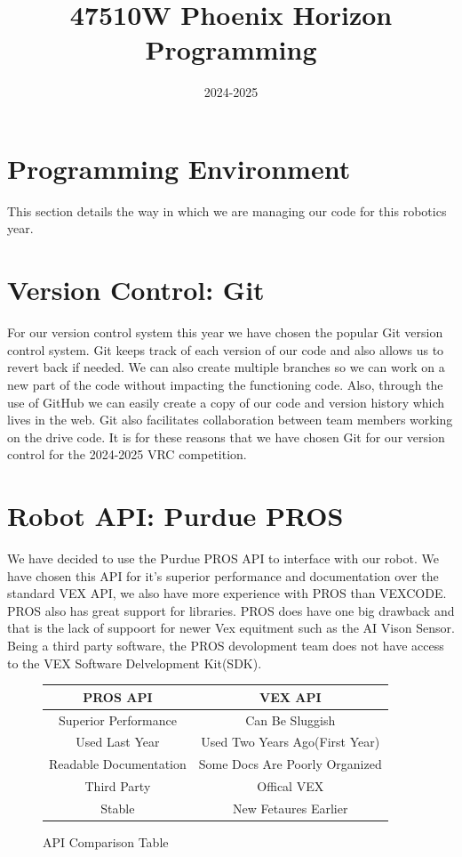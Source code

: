 \documentclass[12pt]{article}
\title{47510W Phoenix Horizon Programming}
\date{2024-2025}
\author{}
\begin{document}
 \maketitle
 \tableofcontents
 \newpage

\section*{Programming Environment}
This section details the way in which we are managing our code for this robotics year.
\section{Version Control: Git}
For our version control system this year we have chosen the popular Git version control system. Git keeps track of each version of our code and also allows us to revert back if needed. We can also create multiple branches so we can work on a new part of the code without impacting the functioning code. Also, through the use of GitHub we can easily create a copy of our code and version history which lives in the web. Git also facilitates collaboration between team members working on the drive code. It is for these reasons that we have chosen Git for our version control for the 2024-2025 VRC competition.
\section{Robot API: Purdue PROS}
We have decided to use the Purdue PROS API to interface with our robot. We have chosen this API for it's superior performance and documentation over the standard VEX API, we also have more experience with PROS than VEXCODE. PROS also has great support for libraries. PROS does have one big drawback and that is the lack of suppoort for newer Vex equitment such as the AI Vison Sensor. Being a third party software, the PROS devolopment team does not have access to the VEX Software Delvelopment Kit(SDK).
\begin{figure}[h]
        \caption{API Comparison Table}
        \label{TABLE::API_COMP}
        \centering
        \begin{tabular}{c|c}
        PROS API & VEX API \\
        \hline
        Superior Performance & Can Be Sluggish \\
        Used Last Year & Used Two Years Ago(First Year) \\
        Readable Documentation & Some Docs Are Poorly Organized \\
        Third Party & Offical VEX \\
        Stable & New Fetaures Earlier \\
    \end{tabular}
\end{figure}
\end{document}
